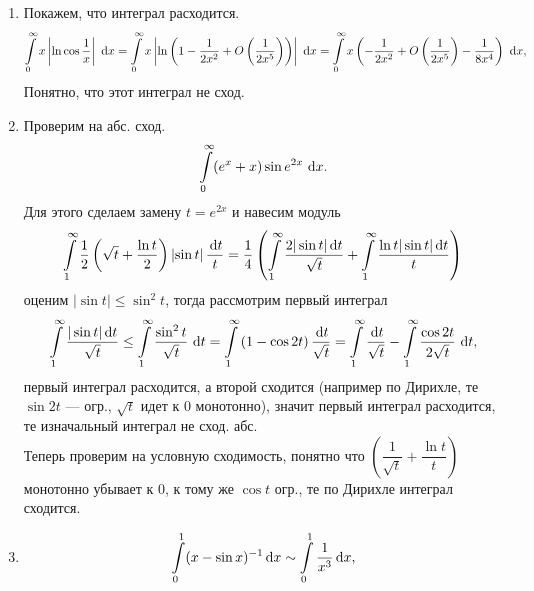 \documentclass{report}
\begin{document}
\sol
\begin{enumerate}
    \item 
      Покажем, что интеграл расходится.
    \[
        \int\limits_{0}^{\infty} x\left|\ln \cos \dfrac{1}{x}\right|\, \dl x = \int\limits_{0}^{\infty} x\left|\ln\left(1-\dfrac{1}{2x^2}+O\left(\dfrac{1}{2x^5}\right)\right)\right|\, \dl x = \int\limits_{0}^{\infty} x\left(-\dfrac{1}{2x^2}+O\left(\dfrac{1}{2x^5}\right)-\dfrac{1}{8x^4}\right)\, \dl x,
    \]
    Понятно, что этот интеграл не сход.  
\item 
    Проверим на абс. сход.
    \[
        \int\limits_{0}^{\infty}(e^x+x)\sin e^{2x}\, \dl x.
    \]
    Для этого сделаем замену $t = e^{2x}$ и навесим модуль
    \[
        \int\limits_{1}^{\infty} \dfrac{1}{2}\left(\sqrt{t}+\dfrac{\ln t}{2}\right)\left|\sin t\right|\dfrac{\dl t}{t} = \dfrac{1}{4}\left(\int \limits_1^{\infty} \dfrac{2|\sin t|\dl t}{\sqrt{t}}+\int\limits_1^{\infty} \dfrac{\ln t|\sin t|\dl t}{t}\right)\,
    \]
    оценим $|\sin t| \le \sin^2t$, тогда рассмотрим первый интеграл 
    \[
        \int\limits_{1}^{\infty} \dfrac{|\sin t|\dl t}{\sqrt{t}} \le \int\limits_{1}^{\infty} \dfrac{\sin^2 t}{\sqrt{t}}\, \dl t = \int\limits_{1}^{\infty} \left(1-\cos 2t\right)\dfrac{\dl t}{\sqrt{t}} = \int\limits_{1}^{\infty} \dfrac{\dl t}{\sqrt{t}} - \int\limits_{1}^{\infty} \dfrac{\cos 2t}{2\sqrt{t}}\, \dl t,
    \]
    первый интеграл расходится, а второй сходится (например по Дирихле, те $\sin 2t$ --- огр., $\sqrt{t}$ идет к 0 монотонно), значит первый интеграл расходится, те изначальный интеграл не сход. абс.\\
    Теперь проверим на условную сходимость, понятно что $\left(\dfrac{1}{\sqrt{t}}+\dfrac{\ln t}{t}\right)$ монотонно убывает к 0, к тому же $\cos t$ огр., те по Дирихле интеграл сходится.\\
\item 
    \[
        \int\limits_{0}^{1}(x-\sin x)^{-1} \dl x \sim \int\limits_{0}^{1}\dfrac{1}{x^3}\dl x,
\]
\end{enumerate}
\end{document}
